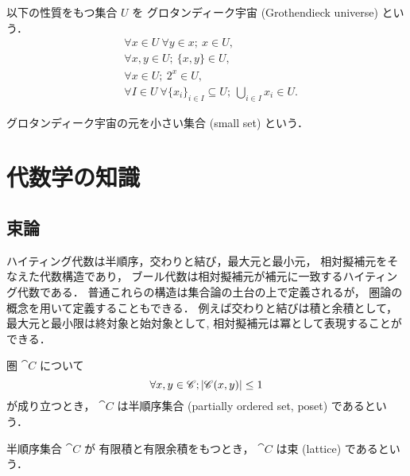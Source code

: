 \documentclass[titlepage]{ltjsreport}
\begin{document}
\begin{definition}[グロタンディーク宇宙]
  \def\U{U}%
  \def\x{x}%
  \def\y{y}%
  以下の性質をもつ集合 $\U$ を
  グロタンディーク宇宙 (Grothendieck universe) という．
  \begin{align}
     & \forall\x\in\U\ \forall\y\in\x;\ \x\in\U,              \\
     & \forall\x,\y\in\U;\ \{\x,\y\}\in\U,                    \\
     & \forall\x\in\U;\ 2^\x\in\U,                            \\
     & \forall I\in\U\ \forall{\{\x_i\}}_{i\in I}\subseteq\U;
    \ \bigcup_{i\in I}\x_i\in\U.
  \end{align}
\end{definition}

\begin{definition}[小さい集合]\label{def:small-set}
  グロタンディーク宇宙の元を小さい集合 (small set) という．
\end{definition}

\chapter{代数学の知識}

\section{束論}

ハイティング代数は半順序，交わりと結び，最大元と最小元，
相対擬補元をそなえた代数構造であり，
ブール代数は相対擬補元が補元に一致するハイティング代数である．
普通これらの構造は集合論の土台の上で定義されるが，
圏論の概念を用いて定義することもできる．
例えば交わりと結びは積と余積として，最大元と最小限は終対象と始対象として,
相対擬補元は冪として表現することができる．

\begin{definition}[半順序集合]
  圏 $\cat{C}$ について
  \begin{equation}
    \forall x,y\in\mathscr{C};|\mathscr{C}(x,y)|\le1
  \end{equation}
  が成り立つとき，
  $\cat{C}$ は半順序集合 (partially ordered set, poset)
  であるという．
\end{definition}

\begin{definition}[束]
  半順序集合 $\cat{C}$ が
  有限積と有限余積をもつとき，
  $\cat{C}$ は束 (lattice) であるという．
\end{definition}
\end{document}
